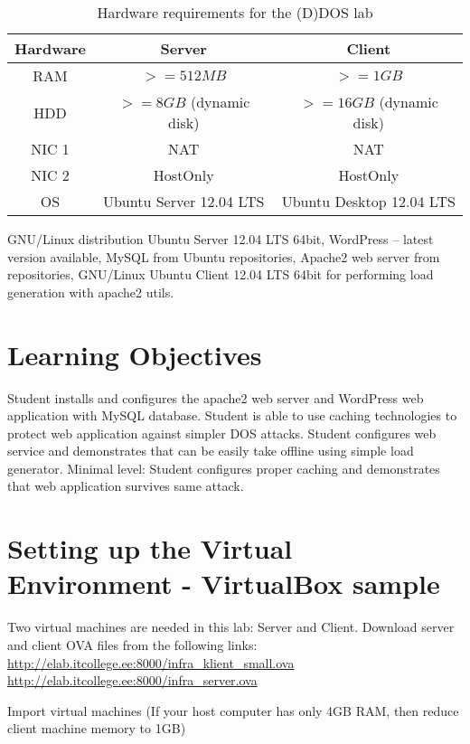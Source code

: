 \begin{table}
\centering
\caption{Hardware requirements for the (D)DOS lab}
\begin{tabular}{|c|c|c|}
\hline 
\rule[-1ex]{0pt}{2.5ex} Hardware & Server & Client \\ 
\hline 
\rule[-1ex]{0pt}{2.5ex} RAM & $>=512MB$ & $>=1GB$\\ 
\hline
\rule[-1ex]{0pt}{2.5ex} HDD & $>=8GB$ (dynamic disk) & $>=16GB$ (dynamic disk)\\ 
\hline 
\rule[-1ex]{0pt}{2.5ex} NIC 1 & NAT  & NAT \\ 
\hline 
\rule[-1ex]{0pt}{2.5ex} NIC 2 & HostOnly & HostOnly \\ 
\hline 
\rule[-1ex]{0pt}{2.5ex} OS & Ubuntu Server 12.04 LTS & Ubuntu Desktop 12.04 LTS\\ 
\hline 
\end{tabular}
\label{table:HW for Wordpress lab}
\end{table}

GNU/Linux distribution Ubuntu Server 12.04 LTS 64bit, WordPress -- latest version available, MySQL from Ubuntu repositories, Apache2 web server from repositories, GNU/Linux Ubuntu Client 12.04 LTS 64bit for performing load generation with apache2 utils.

\section{Learning Objectives}
Student installs and configures the apache2 web server and WordPress web application with \gls{MySQL} database.
Student is able to use caching technologies to protect web application against simpler DOS attacks. Student configures web service and demonstrates that can be
easily take offline using simple load generator. Minimal level: Student configures
proper caching and demonstrates that web application survives same attack.

\section{Setting up the Virtual Environment - VirtualBox sample}
Two virtual machines are needed in this lab: Server and Client.
Download server and client \gls{OVA} files from the following links:
\url{http://elab.itcollege.ee:8000/infra_klient_small.ova}
\url{http://elab.itcollege.ee:8000/infra_server.ova}

Import virtual machines (If your host computer has only 4GB RAM, then reduce client machine memory to 1GB)

